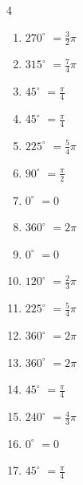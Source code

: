 \begin{multicols}{4}
\begin{enumerate}
  \item $\displaystyle 270^{\circ}$
        $\displaystyle =\frac{3}{2}\pi$

\columnbreak %

  \item $\displaystyle 315^{\circ}$
        $\displaystyle =\frac{7}{4}\pi$

  \item $\displaystyle 45^{\circ}$
        $\displaystyle =\frac{\pi}{4}$

  \item $\displaystyle 45^{\circ}$
        $\displaystyle =\frac{\pi}{4}$

  \item $\displaystyle 225^{\circ}$
        $\displaystyle =\frac{5}{4}\pi$

  \item $\displaystyle 90^{\circ}$
        $\displaystyle =\frac{\pi}{2}$

  \item $\displaystyle 0^{\circ}$
        $\displaystyle =0$

  \item $\displaystyle 360^{\circ}$
        $\displaystyle =2\pi$

  \item $\displaystyle 0^{\circ}$
        $\displaystyle =0$

  \item $\displaystyle 120^{\circ}$
        $\displaystyle =\frac{2}{3}\pi$

  \item $\displaystyle 225^{\circ}$
        $\displaystyle =\frac{5}{4}\pi$

  \item $\displaystyle 360^{\circ}$
        $\displaystyle =2\pi$

  \item $\displaystyle 360^{\circ}$
        $\displaystyle =2\pi$

  \item $\displaystyle 45^{\circ}$
        $\displaystyle =\frac{\pi}{4}$

  \item $\displaystyle 240^{\circ}$
        $\displaystyle =\frac{4}{3}\pi$

  \item $\displaystyle 0^{\circ}$
        $\displaystyle =0$

  \item $\displaystyle 45^{\circ}$
        $\displaystyle =\frac{\pi}{4}$


\end{enumerate}
\end{multicols}
